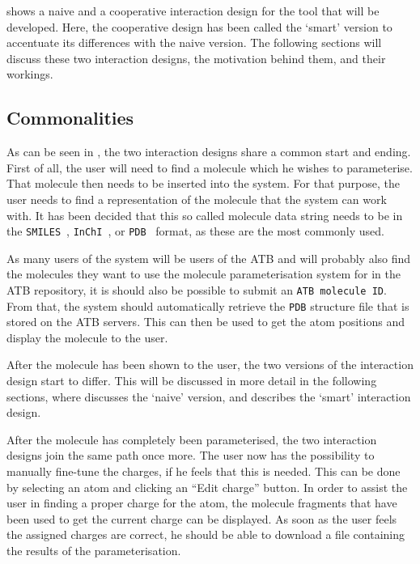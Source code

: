  shows a naive and a cooperative interaction design for the tool that will be developed. Here, the cooperative design has been called the `smart' version to accentuate its differences with the naive version. The following sections will discuss these two interaction designs, the motivation behind them, and their workings.

\subsection{Commonalities}
As can be seen in , the two interaction designs share a common start and ending. First of all, the user will need to find a molecule which he wishes to parameterise. That molecule then needs to be inserted into the system. For that purpose, the user needs to find a representation of the molecule that the system can work with. It has been decided that this so called molecule data string needs to be in the \verb|SMILES|~\cite{daylight1992daylight}, \verb|InChI|~\cite{heller2013inchi}, or \verb|PDB|~\cite{bernstein1977protein} format, as these are the most commonly used.

As many users of the system will be users of the ATB and will probably also find the molecules they want to use the molecule parameterisation system for in the ATB repository, it is should also be possible to submit an \verb|ATB molecule ID|. From that, the system should automatically retrieve the \verb|PDB| structure file that is stored on the ATB servers. This can then be used to get the atom positions and display the molecule to the user.

After the molecule has been shown to the user, the two versions of the interaction design start to differ. This will be discussed in more detail in the following sections, where  discusses the `naive' version, and  describes the `smart' interaction design.

After the molecule has completely been parameterised, the two interaction designs join the same path once more. The user now has the possibility to manually fine-tune the charges, if he feels that this is needed. This can be done by selecting an atom and clicking an ``Edit charge'' button. In order to assist the user in finding a proper charge for the atom, the molecule fragments that have been used to get the current charge can be displayed. As soon as the user feels the assigned charges are correct, he should be able to download a file containing the results of the parameterisation.

